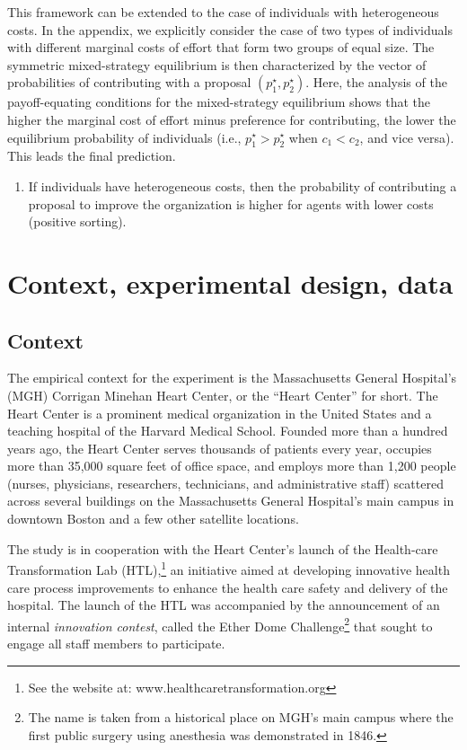 \documentclass[11pt, titlepage]{article}
\providecommand{\tightlist}{%
  \setlength{\itemsep}{0pt}\setlength{\parskip}{0pt}}
\begin{document}
This framework can be extended to the case of individuals with
heterogeneous costs. In the appendix, we explicitly consider the case of
two types of individuals with different marginal costs of effort that
form two groups of equal size. The symmetric mixed-strategy equilibrium
is then characterized by the vector of probabilities of contributing
with a proposal \((p_1^\star, p_2^\star)\). Here, the analysis of the
payoff-equating conditions for the mixed-strategy equilibrium shows that
the higher the marginal cost of effort minus preference for
contributing, the lower the equilibrium probability of individuals
(i.e., \(p_1^\star > p_2^\star\) when \(c_1 < c_2\), and vice versa).
This leads the final prediction.

\begin{enumerate}
\def\labelenumi{\arabic{enumi})}
\setcounter{enumi}{4}
\tightlist
\item
  If individuals have heterogeneous costs, then the probability of
  contributing a proposal to improve the organization is higher for
  agents with lower costs (positive sorting).
\end{enumerate}

\section{Context, experimental design,
data}\label{context-experimental-design-data}

\subsection{Context}\label{context}

The empirical context for the experiment is the Massachusetts General
Hospital's (MGH) Corrigan Minehan Heart Center, or the ``Heart Center''
for short. The Heart Center is a prominent medical organization in the
United States and a teaching hospital of the Harvard Medical School.
Founded more than a hundred years ago, the Heart Center serves thousands
of patients every year, occupies more than 35,000 square feet of office
space, and employs more than 1,200 people (nurses, physicians,
researchers, technicians, and administrative staff) scattered across
several buildings on the Massachusetts General Hospital's main campus in
downtown Boston and a few other satellite locations.

The study is in cooperation with the Heart Center's launch of the
Health-care Transformation Lab (HTL),\footnote{See the website at:
  www.healthcaretransformation.org} an initiative aimed at developing
innovative health care process improvements to enhance the health care
safety and delivery of the hospital. The launch of the HTL was
accompanied by the announcement of an internal \emph{innovation
contest}, called the Ether Dome Challenge\footnote{The name is taken
  from a historical place on MGH's main campus where the first public
  surgery using anesthesia was demonstrated in 1846.} that sought to
engage all staff members to participate.
\end{document}
